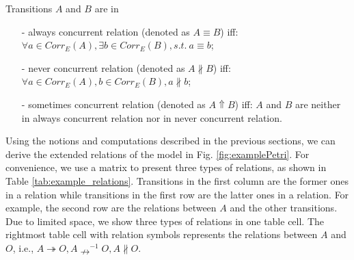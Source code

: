 \documentclass{llncs}
\begin{document}
\begin{definition}\label{def:concurrentRelations}
Transitions $A$ and $B$ are in
	\begin{itemize}
		\item[-] always concurrent relation (denoted as $A\equiv B$) iff: $\forall a\in Corr_{E}(A),\exists b\in Corr_{E}(B),s.t.~a\equiv b$;
		\item[-] never concurrent relation (denoted as $A\nparallel B$) iff: $\forall a\in Corr_{E}(A),b\in Corr_{E}(B),a\nparallel b$;
		\item[-] sometimes concurrent relation (denoted as $A\Uparrow B$) iff: $A$ and $B$ are neither in always concurrent relation nor in never concurrent relation.
	\end{itemize}
\end{definition}

Using the notions and computations described in the previous sections, we can derive the extended relations of the model in Fig. \ref{fig:examplePetri}. For convenience, we use a matrix to present three types of relations, as shown in Table \ref{tab:example_relations}. Transitions in the first column are the former ones in a relation while transitions in the first row are the latter ones in a relation. For example, the second row are the relations between $A$ and the other transitions. Due to limited space, we show three types of relations in one table cell. The rightmost table cell with relation symbols represents the relations between $A$ and $O$, i.e., $A\twoheadrightarrow O,A\nrightarrow^{-1}O,A\nparallel O$.
\end{document}
